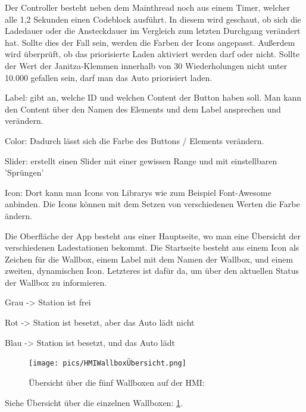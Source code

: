 \begin{compactitem}
  \item Der Controller besteht neben dem Mainthread noch aus einem Timer, welcher alle 1,2 Sekunden einen Codeblock ausführt. In diesem wird geschaut, ob sich die Ladedauer oder die Ansteckdauer im Vergleich zum letzten Durchgang verändert hat. Sollte dies der Fall sein, werden die Farben der Icons angepasst. Außerdem wird überprüft, ob das priorisierte Laden aktiviert werden darf oder nicht. Sollte der Wert der Janitza-Klemmen innerhalb von 30 Wiederholungen nicht unter 10.000 gefallen sein, darf man das Auto priorisiert laden.
  \item Label: gibt an, welche ID und welchen Content der Button haben soll. Man kann den Content über den Namen des Elements und dem Label ansprechen und verändern.
  \item Color: Dadurch lässt sich die Farbe des Buttons / Elements verändern.
  \item Slider: erstellt einen Slider mit einer gewissen Range und mit einstellbaren 'Sprüngen'
  \item Icon: Dort kann man Icons von Librarys wie zum Beispiel Font-Awesome anbinden. Die Icons können mit dem Setzen von verschiedenen Werten die Farbe ändern.
\end{compactitem}
Die Oberfläche der App besteht aus einer Hauptseite, wo man eine Übersicht der verschiedenen Ladestationen bekommt. Die Startseite besteht aus einem Icon als Zeichen für die Wallbox, einem Label mit dem Namen der Wallbox, und einem zweiten, dynamischen Icon. Letzteres ist dafür da, um über den aktuellen Status der Wallbox zu informieren.

\begin{compactitem}
  \item Grau -> Station ist frei
  \item Rot -> Station ist besetzt, aber das Auto lädt nicht
  \item Blau -> Station ist besetzt, und das Auto lädt
\end{compactitem}


\begin{figure}[h t]
  \centering
  \texttt{[image: pics/HMIWallboxÜbersicht.png]}
  \caption{Übersicht über die fünf Wallboxen auf der HMI: }
  \label{fig:impl:HMIWallboxÜbersicht}
\end{figure}

Siehe Übersicht über die einzelnen Wallboxen: \ref{fig:impl:HMIWallboxÜbersicht}.




